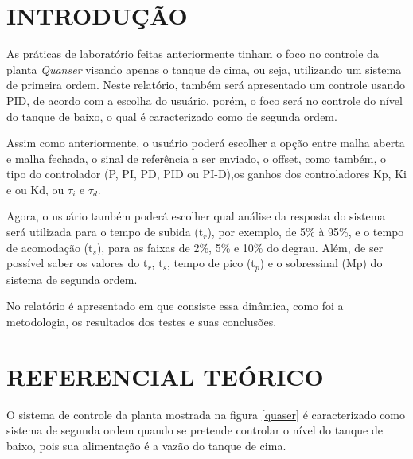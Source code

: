 \documentclass[a4paper,12pt]{article}
\begin{document}

\thispagestyle{main}

\section{INTRODUÇÃO}

\begin{flushleft}
\hspace{4ex}As práticas de laboratório feitas anteriormente tinham o foco no controle da planta \textit{Quanser} visando apenas o tanque de cima, ou seja, utilizando um sistema de primeira ordem. Neste relatório, também será apresentado um controle usando PID, de acordo com a escolha do usuário, porém, o foco será no controle do nível do tanque de baixo, o qual é caracterizado como de segunda ordem.

\hspace{4ex}Assim como anteriormente, o usuário poderá escolher a opção entre malha aberta e malha fechada, o sinal de referência a ser enviado, o offset, como também, o tipo do controlador (P, PI, PD, PID ou PI-D),os ganhos dos controladores Kp, Ki e ou Kd, ou $\tau_i$ e $\tau_d.$ 

\hspace{4ex}Agora, o usuário também poderá escolher qual análise da resposta do sistema será utilizada para o tempo de subida (t$_r$), por exemplo, de 5\% à 95\%, e o tempo de acomodação (t$_s$), para as faixas de 2\%, 5\% e 10\% do degrau. Além, de ser possível saber os valores do t$_r$, t$_s$, tempo de pico (t$_p$) e o sobressinal (Mp) do sistema de segunda ordem.

\hspace{4ex}No relatório é apresentado em que consiste essa dinâmica, como foi a metodologia, os resultados dos testes e suas conclusões.
\end{flushleft}

\newpage


\thispagestyle{main}

\section{REFERENCIAL TEÓRICO}

\hspace{4ex}O sistema de controle da planta mostrada na figura \ref{quaser} é caracterizado como sistema de segunda ordem quando se pretende controlar o nível do tanque de baixo, pois sua alimentação é a vazão do tanque de cima.
\end{document}
